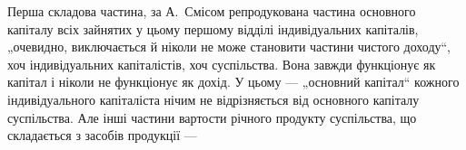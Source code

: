 Перша складова частина, за А.~Смісом репродукована частина основного
капіталу всіх зайнятих у цьому першому відділі індивідуальних
капіталів, „очевидно, виключається й ніколи не може становити частини
чистого доходу“, хоч індивідуальних капіталістів, хоч суспільства. Вона
завжди функціонує як капітал і ніколи не функціонує як дохід. У цьому
— „основний капітал“ кожного індивідуального капіталіста нічим не
відрізняється від основного капіталу суспільства. Але інші частини вартости
річного продукту суспільства, що складається з засобів продукції —
\parbreak{}  %
